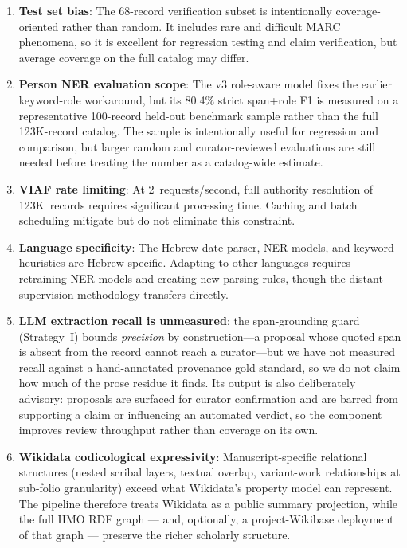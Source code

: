 \documentclass[Afour,sageh,times]{sagej}
\begin{document}
\begin{enumerate}[leftmargin=*]
\item \textbf{Test set bias}: The 68-record verification subset is intentionally coverage-oriented rather than random. It includes rare and difficult MARC phenomena, so it is excellent for regression testing and claim verification, but average coverage on the full catalog may differ.
\item \textbf{Person NER evaluation scope}: The v3 role-aware model fixes the earlier keyword-role workaround, but its 80.4\% strict span+role F1 is measured on a representative 100-record held-out benchmark sample rather than the full 123K-record catalog. The sample is intentionally useful for regression and comparison, but larger random and curator-reviewed evaluations are still needed before treating the number as a catalog-wide estimate.
\item \textbf{VIAF rate limiting}: At 2~requests/second, full authority resolution of 123K~records requires significant processing time. Caching and batch scheduling mitigate but do not eliminate this constraint.
\item \textbf{Language specificity}: The Hebrew date parser, NER models, and keyword heuristics are Hebrew-specific. Adapting to other languages requires retraining NER models and creating new parsing rules, though the distant supervision methodology transfers directly.
\item \textbf{LLM extraction recall is unmeasured}: the span-grounding guard (Strategy~I) bounds \emph{precision} by construction---a proposal whose quoted span is absent from the record cannot reach a curator---but we have not measured recall against a hand-annotated provenance gold standard, so we do not claim how much of the prose residue it finds. Its output is also deliberately advisory: proposals are surfaced for curator confirmation and are barred from supporting a claim or influencing an automated verdict, so the component improves review throughput rather than coverage on its own.
\item \textbf{Wikidata codicological expressivity}: Manuscript-specific relational structures (nested scribal layers, textual overlap, variant-work relationships at sub-folio granularity) exceed what Wikidata's property model can represent. The pipeline therefore treats Wikidata as a public summary projection, while the full HMO RDF graph --- and, optionally, a project-Wikibase deployment of that graph --- preserve the richer scholarly structure.
\end{enumerate}
\end{document}
